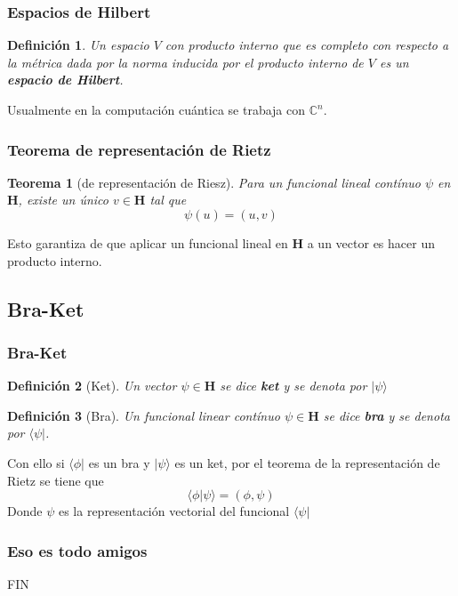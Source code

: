 \documentclass{beamer}
\newtheorem{teo}{Teorema}
\newtheorem{defi}{Definición}
\begin{document}
\begin{frame}
\frametitle{Espacios de Hilbert}
    \begin{defi}
        Un espacio $V$ con producto interno que es completo con respecto a la
        métrica dada por la norma inducida por el producto interno de $V$
        es un \textbf{espacio de Hilbert}.
    \end{defi}
    Usualmente en la computación cuántica se trabaja con $\mathbb{C}^n$.
\end{frame}
\begin{frame}
    \frametitle{Teorema de representación de Rietz}
    \begin{teo}[de representación de Riesz]
        Para un funcional lineal contínuo $\psi$ en $\mathbf{H}$, existe un único $v \in \mathbf{H}$ tal que
        $$
        \psi(u) = (u,v)
        $$
    \end{teo}
	\pause
    Esto garantiza de que aplicar un funcional lineal en $\mathbf{H}$ a un vector es hacer un
    producto interno.
\end{frame}
\subsection{Bra-Ket}
\begin{frame}
\frametitle{Bra-Ket}
\begin{defi}[Ket]
Un vector $\psi \in \mathbf{H}$ se dice \textbf{ket} y se denota por $| \psi \rangle$
\end{defi}
	\pause
\begin{defi}[Bra]
Un funcional linear contínuo $\psi \in \mathbf{H}$ se dice \textbf{bra} y se denota por $\langle \psi |$.
\end{defi}
	\pause
Con ello si $\langle \phi |$ es un bra y $| \psi \rangle$ es un ket, por el teorema
    de la representación de Rietz se tiene que
$$
    \langle \phi | \psi \rangle = (\phi,\psi)
$$
Donde $\psi$ es la representación vectorial del funcional $\langle \psi |$
\end{frame}
\begin{frame}
	\frametitle{Eso es todo amigos}
	FIN
\end{frame}
\end{document}
